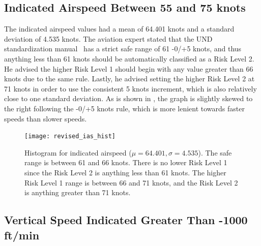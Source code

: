     
    	
    \subsection{Indicated Airspeed Between 55 and 75 knots}
    
          The indicated airspeed values had a mean of 64.401 knots and a standard deviation of 4.535 knots.  The aviation expert stated that the UND standardization manual~\cite{und_flight_manual} has a strict safe range of 61 -0/+5 knots, and thus anything less than 61 knots should be automatically classified as a Risk Level 2.  He advised the higher Risk Level 1 should begin with any value greater than 66 knots due to the same rule.  Lastly, he advised setting the higher Risk Level 2 at 71 knots in order to use the consistent 5 knots increment, which is also relatively close to one standard deviation.  As is shown in , the graph is slightly skewed to the right following the -0/+5 knots rule, which is more lenient towards faster speeds than slower speeds.

		\begin{figure}
			\centering
            \texttt{[image: revised\_ias\_hist]}
            \caption{Histogram for indicated airspeed ($\mu = 64.401, \sigma = 4.535$).  The safe range is between 61 and 66 knots.  There is no lower Risk Level 1 since the Risk Level 2 is anything less than 61 knots.  The higher Risk Level 1 range is between 66 and 71 knots, and the Risk Level 2 is anything greater than 71 knots.}
            \label{fig:revised_ias_hist}
		\end{figure}



    \subsection{Vertical Speed Indicated Greater Than -1000 ft/min}
    
